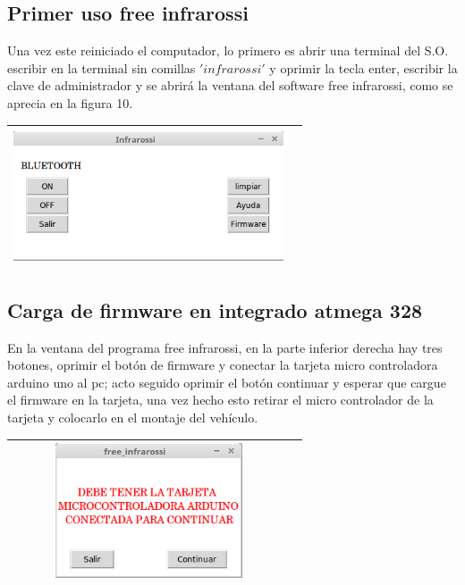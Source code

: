 \documentclass[12]{article}
\newenvironment{Figure}
{\par\medskip\noindent\minipage{\linewidth}}
{\endminipage\par\medskip}
\begin{document}
\begin{multicols}{2}
\subsection{Primer uso free infrarossi}
Una vez este reiniciado el computador, lo primero  es abrir una terminal del S.O. escribir en la terminal sin comillas $'infrarossi'$ y oprimir la tecla enter, escribir la clave de administrador y se abrirá la ventana del software free infrarossi, como se aprecia en la figura 10.
\begin{Figure}	
\center
\begin{tabular}{|l|r|}
\hline
\includegraphics[width=8cm, height=4cm]{img/infrarossi.png} \\ \hline
\end{tabular}
\label{fig:g10}
\end{Figure}
\subsection{Carga de firmware en integrado atmega 328}
En la ventana del programa free infrarossi, en la parte inferior derecha hay tres botones, oprimir el botón de firmware y conectar la tarjeta micro controladora arduino uno al pc; acto seguido oprimir el botón continuar y esperar que cargue el firmware en la tarjeta, una vez hecho esto retirar el micro controlador de la tarjeta y colocarlo en el montaje del vehículo.
\begin{Figure}	
\center
\begin{tabular}{|l|r|}
\hline
\includegraphics[width=8cm, height=4cm]{img/firmware.png} \\ \hline
\end{tabular}
\label{fig:g11}
\end{Figure}

\end{multicols}
\end{document}
